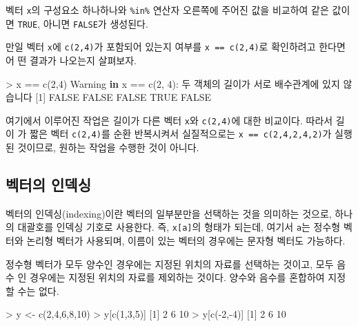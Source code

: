 \documentclass[
]{book}
\newenvironment{Shaded}{\begin{snugshade}}{\end{snugshade}}
\newcommand{\ConstantTok}[1]{\textcolor[rgb]{0.00,0.00,0.00}{#1}}
\newcommand{\ControlFlowTok}[1]{\textcolor[rgb]{0.13,0.29,0.53}{\textbf{#1}}}
\newcommand{\DecValTok}[1]{\textcolor[rgb]{0.00,0.00,0.81}{#1}}
\newcommand{\FunctionTok}[1]{\textcolor[rgb]{0.00,0.00,0.00}{#1}}
\newcommand{\NormalTok}[1]{#1}
\newcommand{\OtherTok}[1]{\textcolor[rgb]{0.56,0.35,0.01}{#1}}
\newcommand{\SpecialCharTok}[1]{\textcolor[rgb]{0.00,0.00,0.00}{#1}}
\begin{document}
벡터 \texttt{x}의 구성요소 하나하나와 \texttt{\%in\%} 연산자 오른쪽에 주어진 값을 비교하여 같은 값이
면 \texttt{TRUE}, 아니면 \texttt{FALSE}가 생성된다.

만일 벡터 \texttt{x}에 \texttt{c(2,4)}가 포함되어 있는지 여부를 \texttt{x\ ==\ c(2,4)}로 확인하려고 한다면 어
떤 결과가 나오는지 살펴보자.

\begin{Shaded}
\begin{Highlighting}[]
\SpecialCharTok{\textgreater{}}\NormalTok{ x }\SpecialCharTok{==} \FunctionTok{c}\NormalTok{(}\DecValTok{2}\NormalTok{,}\DecValTok{4}\NormalTok{)}
\NormalTok{Warning }\ControlFlowTok{in}\NormalTok{ x }\SpecialCharTok{==} \FunctionTok{c}\NormalTok{(}\DecValTok{2}\NormalTok{, }\DecValTok{4}\NormalTok{)}\SpecialCharTok{:}\NormalTok{ 두 객체의 길이가 서로 배수관계에 있지 않습니다}
\NormalTok{[}\DecValTok{1}\NormalTok{] }\ConstantTok{FALSE} \ConstantTok{FALSE} \ConstantTok{FALSE}  \ConstantTok{TRUE} \ConstantTok{FALSE}
\end{Highlighting}
\end{Shaded}

여기에서 이루어진 작업은 길이가 다른 벡터 \texttt{x}와 \texttt{c(2,4)}에 대한 비교이다. 따라서 길이
가 짧은 벡터 \texttt{c(2,4)}를 순환 반복시켜서 실질적으로는 \texttt{x\ ==\ c(2,4,2,4,2)}가 실행된
것이므로, 원하는 작업을 수행한 것이 아니다.

\hypertarget{uxbca1uxd130uxc758-uxc778uxb371uxc2f1}{%
\subsection{벡터의 인덱싱}\label{uxbca1uxd130uxc758-uxc778uxb371uxc2f1}}

벡터의 인덱싱(indexing)이란 벡터의 일부분만을 선택하는 것을 의미하는 것으로, 하나의
대괄호를 인덱싱 기호로 사용한다. 즉, \texttt{x{[}a{]}}의 형태가 되는데, 여기서 \texttt{a}는 정수형 벡터와 논리형 벡터가 사용되며, 이름이 있는 벡터의 경우에는 문자형 벡터도 가능하다.

정수형 벡터가 모두 양수인 경우에는 지정된 위치의 자료를 선택하는 것이고, 모두 음수
인 경우에는 지정된 위치의 자료를 제외하는 것이다. 양수와 음수를 혼합하여 지정할 수는
없다.

\begin{Shaded}
\begin{Highlighting}[]
\SpecialCharTok{\textgreater{}}\NormalTok{ y }\OtherTok{\textless{}{-}} \FunctionTok{c}\NormalTok{(}\DecValTok{2}\NormalTok{,}\DecValTok{4}\NormalTok{,}\DecValTok{6}\NormalTok{,}\DecValTok{8}\NormalTok{,}\DecValTok{10}\NormalTok{)}
\SpecialCharTok{\textgreater{}}\NormalTok{ y[}\FunctionTok{c}\NormalTok{(}\DecValTok{1}\NormalTok{,}\DecValTok{3}\NormalTok{,}\DecValTok{5}\NormalTok{)]}
\NormalTok{[}\DecValTok{1}\NormalTok{]  }\DecValTok{2}  \DecValTok{6} \DecValTok{10}
\SpecialCharTok{\textgreater{}}\NormalTok{ y[}\FunctionTok{c}\NormalTok{(}\SpecialCharTok{{-}}\DecValTok{2}\NormalTok{,}\SpecialCharTok{{-}}\DecValTok{4}\NormalTok{)]}
\NormalTok{[}\DecValTok{1}\NormalTok{]  }\DecValTok{2}  \DecValTok{6} \DecValTok{10}
\end{Highlighting}
\end{Shaded}
\end{document}
